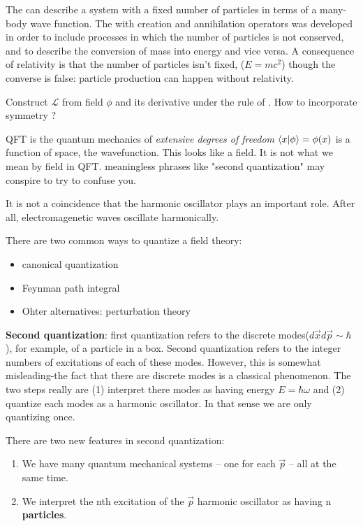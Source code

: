 The \QM{} can describe a system with a fixed number of particles
in terms of a many-body wave function. The \RQFT{}
with creation and annihilation operators was developed in order to include
processes in which the number of particles is not conserved,
and to describe the conversion of mass into energy and vice versa.
A consequence of relativity is that the number of particles isn't fixed, ($E=mc^2$)
though the converse is false: particle production can happen without relativity.

Construct $\mathcal{L}$ from field $\phi$ and its derivative under the rule
of \LI{}. How to incorporate symmetry ?

QFT is the quantum mechanics of {\Large \textit{extensive degrees of freedom}}
$\bra{x}\ket{\phi} = \phi(x)$ is a function of space, the wavefunction.
This looks like a field. It is not what we mean by field in QFT.
meaningless phrases like "second quantization" may conspire to try
to confuse you.

It is not a coincidence that the harmonic oscillator plays an important
role. After all, electromagenetic waves oscillate harmonically.

There are two common ways to quantize a field theory:
\begin{itemize}
    \item canonical quantization
    \item Feynman path integral
    \item Ohter alternatives: perturbation theory
\end{itemize}

\textbf{Second quantization}: first quantization refers to the discrete
modes($d\vec{x}d\vec{p}\sim \hbar$), for example, of a particle in a box.
Second quantization refers to the integer numbers of excitations of each of
these modes. However, this is somewhat misleading-the fact that there are
discrete modes is a classical phenomenon. The two steps really are (1)
interpret there modes as having energy $E=\hbar\omega$ and (2) quantize each
modes as a harmonic oscillator. In that sense we are only quantizing once.

There are two new features in second quantization:
\begin{enumerate}
    \item We have many quantum mechanical systems – one for each $\vec{p}$  – all at the same time.
    \item We interpret the nth excitation of the $\vec{p}$  harmonic
	oscillator as having n \textbf{particles}.
\end{enumerate}
